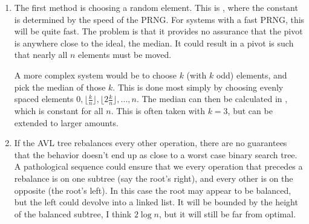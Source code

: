 \documentclass[12pt]{chmullighw}
\begin{document}
\begin{enumerate}
\item The first method is choosing a random element. This is , where the constant is determined by the speed of the PRNG. For systems with a fast PRNG, this will be quite fast. The problem is that it provides no assurance that the pivot is anywhere close to the ideal, the median. It could result in a pivot is such that nearly all $n$ elements must be moved.

A more complex system would be to choose $k$ (with $k$ odd) elements, and pick the median of those $k$. This is done most simply by choosing evenly spaced elements $0, \lfloor\frac{k}{n}\rfloor, \lfloor2\frac{k}{n}\rfloor, ..., n$. The median can then be calculated in , which is constant for all $n$. This is often taken with $k = 3$, but can be extended to larger amounts.

\item If the AVL tree rebalances every other operation, there are no guarantees that the behavior doesn't end up as close to a worst case binary search tree. A pathological sequence could ensure that we every operation that precedes a rebalance is on one subtree (say the root's right), and every other is on the opposite (the root's left). In this case the root may appear to be balanced, but the left could devolve into a linked list. It will be bounded by the height of the balanced subtree, I think $2 \log n$, but it will still be far from optimal.

\end{enumerate} %
\end{document}
